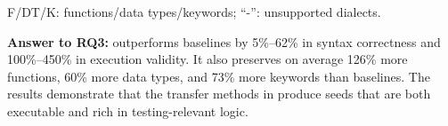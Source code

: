 \documentclass[conference]{IEEEtran}
\begin{document}
\begin{table}[t]
\centering
\caption{Valid SQL features in transferred seeds.}
\label{tab:diversity}
\scriptsize
\setlength{\tabcolsep}{1pt}
\renewcommand{\arraystretch}{0.95}
\par\vspace{0.2em}
{\footnotesize F/DT/K: functions/data types/keywords; ``-'': unsupported dialects.}
\end{table}



\begin{answerbox}
\textbf{Answer to RQ3:} 
\tool{} outperforms baselines by 5\%--62\% in syntax correctness and 100\%--450\% in execution validity.
It also preserves on average 126\% more functions, 60\% more data types, and 73\% more keywords than baselines.
The results demonstrate that the transfer methods in \tool{} produce seeds that are both executable and rich in testing-relevant logic.
\end{answerbox}
\end{document}
